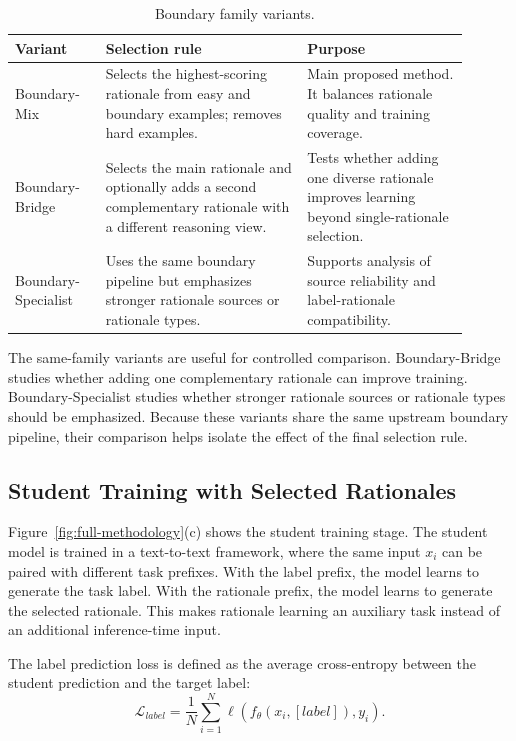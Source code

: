 \begin{table}[H]
\centering
\caption{Boundary family variants.}
\label{tab:boundary-family-variants}
\begin{tabular}{p{0.18\linewidth} p{0.40\linewidth} p{0.32\linewidth}}
\hline
Variant & Selection rule & Purpose \\
\hline
Boundary-Mix &
Selects the highest-scoring rationale from easy and boundary examples; removes hard examples. &
Main proposed method. It balances rationale quality and training coverage. \\
\hline
Boundary-Bridge &
Selects the main rationale and optionally adds a second complementary rationale with a different reasoning view. &
Tests whether adding one diverse rationale improves learning beyond single-rationale selection. \\
\hline
Boundary-Specialist &
Uses the same boundary pipeline but emphasizes stronger rationale sources or rationale types. &
Supports analysis of source reliability and label-rationale compatibility. \\
\hline
\end{tabular}
\end{table}

The same-family variants are useful for controlled comparison. Boundary-Bridge studies whether adding one complementary rationale can improve training. Boundary-Specialist studies whether stronger rationale sources or rationale types should be emphasized. Because these variants share the same upstream boundary pipeline, their comparison helps isolate the effect of the final selection rule.

\subsection{Student Training with Selected Rationales}
\label{sec:student-training}

Figure~\ref{fig:full-methodology}(c) shows the student training stage. The student model is trained in a text-to-text framework, where the same input $x_i$ can be paired with different task prefixes. With the label prefix, the model learns to generate the task label. With the rationale prefix, the model learns to generate the selected rationale. This makes rationale learning an auxiliary task instead of an additional inference-time input.

The label prediction loss is defined as the average cross-entropy between the student prediction and the target label:
\begin{equation}
    \mathcal{L}_{label}
    = \frac{1}{N}\sum_{i=1}^{N}
    \ell(f_\theta(x_i, [label]), y_i).
    \label{eq:label-loss}
\end{equation}

